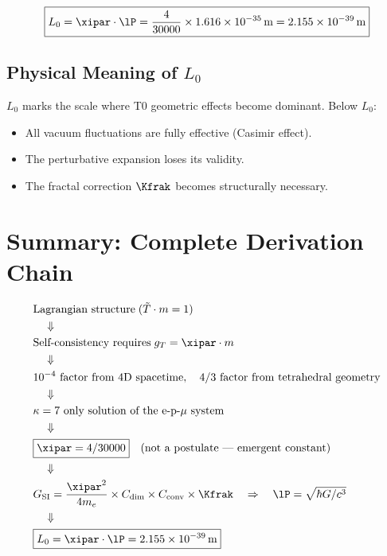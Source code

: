 \begin{keyresult}
\begin{equation}
	\boxed{L_0 = \xipar \cdot \lP = \frac{4}{30000} \times 1{.}616 \times 10^{-35}\,\text{m} = 2{.}155 \times 10^{-39}\,\text{m}}
\end{equation}
\end{keyresult}

\subsection{Physical Meaning of \texorpdfstring{$L_0$}{L0}}

$L_0$ marks the scale where T0 geometric effects become dominant. Below $L_0$:
\begin{itemize}
	\item All vacuum fluctuations are fully effective (Casimir effect).
	\item The perturbative expansion loses its validity.
	\item The fractal correction $\Kfrak$ becomes structurally necessary.
\end{itemize}

\section{Summary: Complete Derivation Chain}

\begin{keyresult}
\begin{align}
	&\text{Lagrangian structure} \; (\tilde{T} \cdot m = 1) \notag \\
	&\quad\Downarrow \notag \\
	&\text{Self-consistency requires} \; g_T = \xipar \cdot m \notag \\
	&\quad\Downarrow \notag \\
	&10^{-4}\text{ factor from 4D spacetime},\quad 4/3\text{ factor from tetrahedral geometry} \notag \\
	&\quad\Downarrow \notag \\
	&\kappa = 7 \text{ only solution of the e-p-}\mu\text{ system} \notag \\
	&\quad\Downarrow \notag \\
	&\boxed{\xipar = 4/30000} \quad \text{(not a postulate — emergent constant)} \notag \\
	&\quad\Downarrow \notag \\
	&G_{\text{SI}} = \frac{\xipar^2}{4m_e} \times C_{\text{dim}} \times C_{\text{conv}} \times \Kfrak \quad\Rightarrow\quad \lP = \sqrt{\hbar G/c^3} \notag \\
	&\quad\Downarrow \notag \\
	&\boxed{L_0 = \xipar \cdot \lP = 2{.}155 \times 10^{-39}\,\text{m}}
\end{align}
\end{keyresult}

